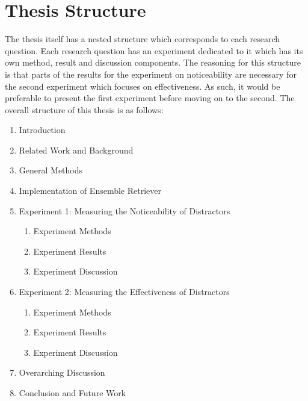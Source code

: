 \section{Thesis Structure}
The thesis itself has a nested structure which corresponds to each research question. Each research question has an experiment dedicated to it which has its own method, result and discussion components. The reasoning for this structure is that parts of the results for the experiment on noticeability are necessary for the second experiment which focuses on effectiveness. As such, it would be preferable to present the first experiment before moving on to the second. The overall structure of this thesis is as follows:

\begin{enumerate}
    \item Introduction
    \item Related Work and Background
    \item General Methods
    \item Implementation of Ensemble Retriever
    \item Experiment 1: Measuring the Noticeability of Distractors
    \begin{enumerate}
        \item Experiment Methods
        \item Experiment Results
        \item Experiment Discussion
    \end{enumerate}
    \item Experiment 2: Measuring the Effectiveness of Distractors
    \begin{enumerate}
        \item Experiment Methods
        \item Experiment Results
        \item Experiment Discussion
    \end{enumerate}
    \item Overarching Discussion
    \item Conclusion and Future Work
\end{enumerate}